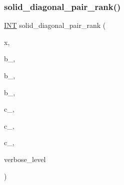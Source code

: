 \subsubsection{\texorpdfstring{solid\+\_\+diagonal\+\_\+pair\+\_\+rank()}{solid\_diagonal\_pair\_rank()}}
{\footnotesize\ttfamily \mbox{\hyperlink{galois_8h_a09fddde158a3a20bd2dcadb609de11dc}{I\+NT}} solid\+\_\+diagonal\+\_\+pair\+\_\+rank (\begin{DoxyParamCaption}\item[{\mbox{\hyperlink{galois_8h_a09fddde158a3a20bd2dcadb609de11dc}{I\+NT}} $\ast$}]{x,  }\item[{\mbox{\hyperlink{galois_8h_a09fddde158a3a20bd2dcadb609de11dc}{I\+NT}}}]{b\+\_,  }\item[{\mbox{\hyperlink{galois_8h_a09fddde158a3a20bd2dcadb609de11dc}{I\+NT}}}]{b\+\_,  }\item[{\mbox{\hyperlink{galois_8h_a09fddde158a3a20bd2dcadb609de11dc}{I\+NT}}}]{b\+\_,  }\item[{\mbox{\hyperlink{galois_8h_a09fddde158a3a20bd2dcadb609de11dc}{I\+NT}}}]{c\+\_,  }\item[{\mbox{\hyperlink{galois_8h_a09fddde158a3a20bd2dcadb609de11dc}{I\+NT}}}]{c\+\_,  }\item[{\mbox{\hyperlink{galois_8h_a09fddde158a3a20bd2dcadb609de11dc}{I\+NT}}}]{c\+\_,  }\item[{\mbox{\hyperlink{galois_8h_a09fddde158a3a20bd2dcadb609de11dc}{I\+NT}}}]{verbose\+\_\+level }\end{DoxyParamCaption})}

\mbox{\label{hamming_8_c_a5d57b4de506bae7edef768fbf327ef40}} 
